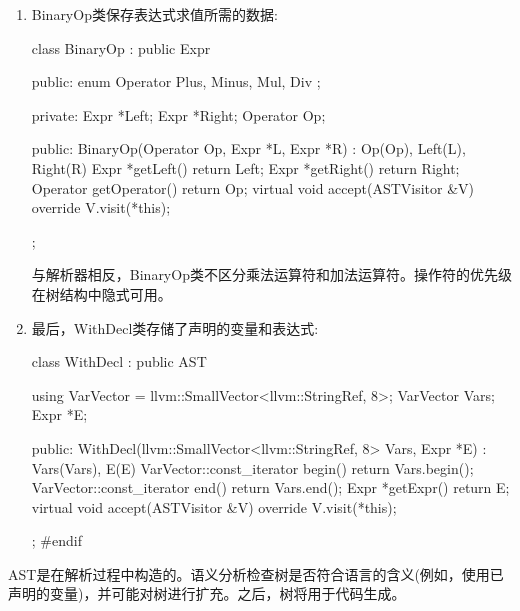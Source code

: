 \begin{enumerate}
\item
BinaryOp类保存表达式求值所需的数据:

\begin{cpp}
class BinaryOp : public Expr {
public:
    enum Operator { Plus, Minus, Mul, Div };

private:
    Expr *Left;
    Expr *Right;
    Operator Op;

public:
    BinaryOp(Operator Op, Expr *L, Expr *R)
        : Op(Op), Left(L), Right(R) {}
    Expr *getLeft() { return Left; }
    Expr *getRight() { return Right; }
    Operator getOperator() { return Op; }
    virtual void accept(ASTVisitor &V) override {
        V.visit(*this);
    }
};
\end{cpp}

与解析器相反，BinaryOp类不区分乘法运算符和加法运算符。操作符的优先级在树结构中隐式可用。

\item
最后，WithDecl类存储了声明的变量和表达式:

\begin{cpp}
class WithDecl : public AST {
    using VarVector =
        llvm::SmallVector<llvm::StringRef, 8>;
    VarVector Vars;
    Expr *E;

public:
    WithDecl(llvm::SmallVector<llvm::StringRef, 8> Vars,
            Expr *E)
        : Vars(Vars), E(E) {}
    VarVector::const_iterator begin()
                                { return Vars.begin(); }
    VarVector::const_iterator end() { return Vars.end(); }
    Expr *getExpr() { return E; }
    virtual void accept(ASTVisitor &V) override {
        V.visit(*this);
    }
};
#endif
\end{cpp}

\end{enumerate}

AST是在解析过程中构造的。语义分析检查树是否符合语言的含义(例如，使用已声明的变量)，并可能对树进行扩充。之后，树将用于代码生成。